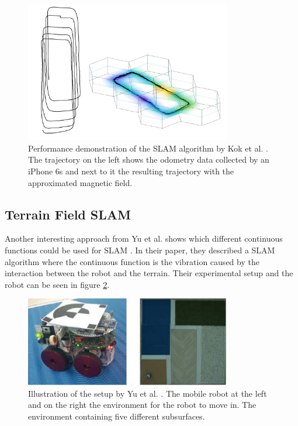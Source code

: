 \begin{figure}[h!]
	\centering
	\includegraphics[width=0.8\textwidth]{images/kok_example.png}
	\caption{
		Performance demonstration of the SLAM algorithm by Kok et al. \cite{kok_scalable_2018}. The trajectory on the left shows the odometry data collected by an iPhone 6s and next to it the resulting trajectory with the approximated magnetic field.
	}
	\label{fig:kok_example}
\end{figure}

\newpage
\subsection{Terrain Field SLAM}
\label{sec:terrain_slam}
Another interesting approach from Yu et al. shows which different continuous functions could be used for SLAM \cite{yu_terrain_2018}. In their paper, they described a SLAM algorithm where the continuous function is the vibration caused by the interaction between the robot and the terrain. Their experimental setup and the robot can be seen in figure \ref{fig:yu_setup}.

\begin{figure}[h!]
	\centering
	\includegraphics[width=0.8\textwidth]{images/yu_setup.png}
	\caption{
		Illustration of the setup by Yu et al. \cite{yu_terrain_2018}. The mobile robot at the left and
		on the right the environment for the robot to move in. The environment containing
		five different subsurfaces.
	}
	\label{fig:yu_setup}
\end{figure}

